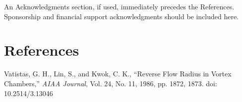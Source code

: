 \documentclass{AIAA}
\begin{document}
An Acknowledgments section, if used, immediately precedes the References. Sponsorship and financial support acknowledgments should be included here.

\section*{References}

\begin{thebibliography}{}
 Vatistas, G. H., Lin, S., and Kwok, C. K., ``Reverse Flow Radius in Vortex Chambers,'' \textit{AIAA Journal}, Vol. 24, No. 11, 1986, pp. 1872, 1873. doi: 10.2514/3.13046

\end{thebibliography}
\end{document}
